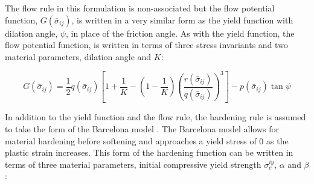 





The flow rule in this formulation is non-associated but the flow potential function, $G\left(\bar{\sigma}_{ij}\right)$, is written in a very similar form as the yield function with dilation angle, $\psi$, in place of the friction angle. As with the yield function, the flow potential function, is written in terms of three stress invariants and two material parameters, dilation angle and $K$:

\begin{equation}
G\left(\bar{\sigma}_{ij}\right)=\frac{1}{2}q\left(\bar{\sigma}_{ij}\right)\left [ 1+\frac{1}{K}-\left ( 1-\frac{1}{K} \right )\left ( \frac{r\left(\bar{\sigma}_{ij}\right)}{q\left(\bar{\sigma}_{ij}\right)} \right )^3 \right ]-p\left(\bar{\sigma}_{ij}\right)\tan\psi\label{eqn:const11}
\end{equation}

In addition to the yield function and the flow rule, the hardening rule is assumed to take the form of the Barcelona model \citep{lubliner_plastic-damage_1989}. The Barcelona model allows for material hardening before softening and approaches a yield stress of 0 as the plastic strain increases.  This form of the hardening function can be written in terms of three material parameters, initial compressive yield strength $\sigma_c^{iy}$, $\alpha$ and $\beta$:


